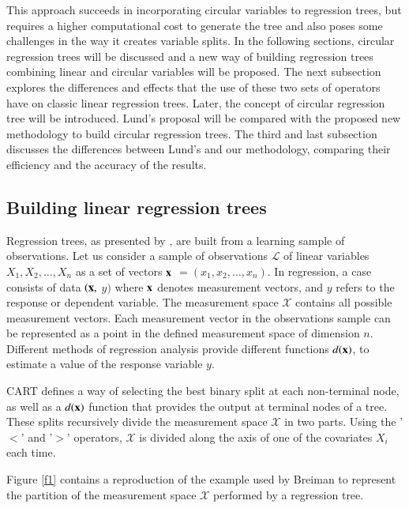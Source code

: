 \documentclass[times,twocolumn,final,authoryear]{elsarticle}
\begin{document}
This approach succeeds in incorporating circular variables to regression trees, but requires a higher computational cost to generate the tree and also poses some challenges in the way it creates variable splits. In the following sections, circular regression trees will be discussed and a new way of building regression trees combining linear and circular variables will be proposed. The next subsection explores the differences and effects that the use of these two sets of operators have on classic linear regression trees. Later, the concept of circular regression tree will be introduced. Lund's proposal will be compared with the proposed new methodology to build circular regression trees. The third and last subsection discusses the differences between Lund's and our methodology, comparing their efficiency and the accuracy of the results.

\subsection{Building linear regression trees}

Regression trees, as presented by \citep{Breimanetal1984}, are built from a learning sample of observations. Let us consider a sample of observations $\mathcal{L}$ of linear variables $ X_1, X_2, \dots, X_n $ as a set of vectors $\bf{x} $ $= (x_1, x_2, \dots, x_n)$. In regression, a case consists of data $(\bf{x},$ $y)$ where $\bf{x}$ denotes measurement vectors, and $ y $ refers to the response or dependent variable. The measurement space $\mathcal{X}$ contains all possible measurement vectors. Each measurement vector in the observations sample can be represented as a point in the defined measurement space of dimension $n$. Different methods of regression analysis provide different functions $d(\bf{x})$, to estimate a value of the response variable $y$.

CART defines a way of selecting the best binary split at each non-terminal node, as well as a $d(\bf{x})$ function that provides the output at terminal nodes of a tree. These splits recursively divide the measurement space $\mathcal{X}$ in two parts. Using the '$<$' and '$>$' operators, $\mathcal{X}$ is divided along the axis of one of the covariates $X_i$ each time.

Figure \ref{f1} contains a reproduction of the example used by Breiman to represent the partition of the measurement space $\mathcal{X}$ performed by a regression tree.
\end{document}
